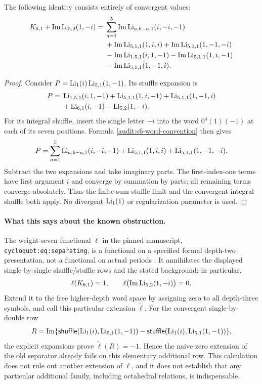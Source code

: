\begin{proposition}
\label{audit:s6-depth-three}
The following identity consists entirely of convergent values:
\begin{align}
 K_{6,1}+\operatorname{Im}\operatorname{Li}_{5,2}(1,-i)
 ={}&\sum_{a=1}^{5}
       \operatorname{Im}\operatorname{Li}_{a,6-a,1}(i,-i,-1)\notag\\
 &+\operatorname{Im}\operatorname{Li}_{5,1,1}(1,i,i)
   +\operatorname{Im}\operatorname{Li}_{5,1,1}(1,-1,-i)\notag\\
 &-\operatorname{Im}\operatorname{Li}_{1,5,1}(i,1,-1)
   -\operatorname{Im}\operatorname{Li}_{5,1,1}(1,i,-1)\notag\\
 &-\operatorname{Im}\operatorname{Li}_{5,1,1}(1,-1,i).
 \label{audit:s6-depth-three-identity}
\end{align}
\end{proposition}
\begin{proof}
Consider $P=\operatorname{Li}_1(i)\operatorname{Li}_{5,1}(1,-1)$. Its stuffle expansion is
\begin{align*}
 P={}&\operatorname{Li}_{1,5,1}(i,1,-1)+\operatorname{Li}_{5,1,1}(1,i,-1)
       +\operatorname{Li}_{5,1,1}(1,-1,i)\\
    &+\operatorname{Li}_{6,1}(i,-1)+\operatorname{Li}_{5,2}(1,-i).
\end{align*}
For its integral shuffle, insert the single letter $-i$ into the word
$0^4(1)(-1)$ at each of its seven positions. Formula
\eqref{audit:s6-word-convention} then gives
\[
 P=\sum_{a=1}^{5}\operatorname{Li}_{a,6-a,1}(i,-i,-1)
       +\operatorname{Li}_{5,1,1}(1,i,i)+\operatorname{Li}_{5,1,1}(1,-1,-i).
\]
Subtract the two expansions and take imaginary parts. The first-index-one
terms have first argument $i$ and converge by summation by parts; all
remaining terms converge absolutely. Thus the finite-sum stuffle limit
and the convergent integral shuffle both apply. No divergent
$\operatorname{Li}_1(1)$ or regularization parameter is used.
\end{proof}

\paragraph{What this says about the known obstruction.}
The weight-seven functional $\ell$ in the pinned manuscript,
\texttt{cycloquot:eq:separating}, is a functional on a specified formal
depth-two presentation, not a functional on actual periods
\cite{Repo}. It annihilates the displayed single-by-single
shuffle/stuffle rows and the stated background; in particular,
\[
 \ell(K_{6,1})=1,\qquad
 \ell\bigl(\operatorname{Im}\operatorname{Li}_{5,2}(1,-i)\bigr)=0.
\]
Extend it to the free higher-depth word space by assigning zero to all
depth-three symbols, and call this particular extension $\widetilde\ell$.
For the convergent single-by-double row
\[
 R=\operatorname{Im}\{\mathsf{shuffle}(\operatorname{Li}_1(i),\operatorname{Li}_{5,1}(1,-1))
               -\mathsf{stuffle}(\operatorname{Li}_1(i),\operatorname{Li}_{5,1}(1,-1))\},
\]
the explicit expansions prove $\widetilde\ell(R)=-1$. Hence the naive
zero extension of the old separator already fails on this elementary
additional row. This calculation does not rule out another extension of
$\ell$, and it does not establish that any particular additional family,
including octahedral relations, is indispensable.

